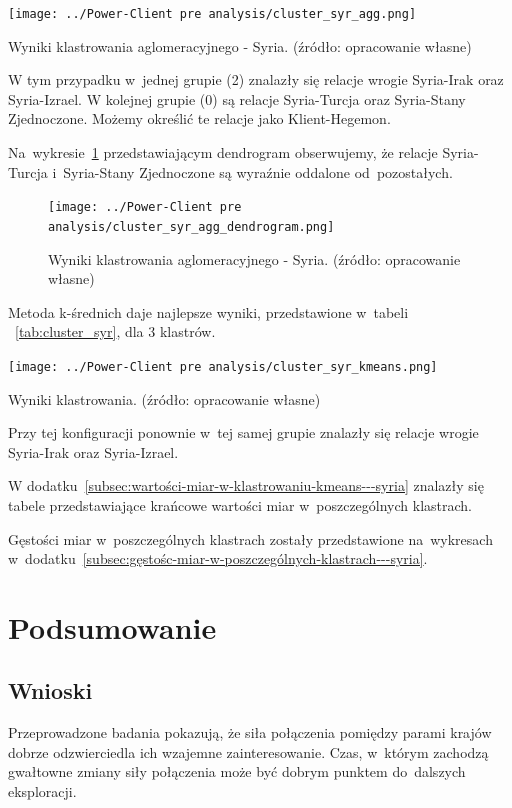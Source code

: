 \documentclass[11pt]{report}
\begin{document}
    \begin{table}[tp]
        \centering
        \texttt{[image: ../Power-Client pre analysis/cluster\_syr\_agg.png]}
        \caption{Wyniki klastrowania aglomeracyjnego - Syria. (źródło: opracowanie własne)}
        \label{tab:cluster_syr_agg}
    \end{table}

    W tym przypadku w~jednej grupie (2) znalazły się relacje wrogie Syria-Irak oraz Syria-Izrael.
    W kolejnej grupie (0) są relacje Syria-Turcja oraz Syria-Stany Zjednoczone.
    Możemy określić te relacje jako Klient-Hegemon.


    Na~wykresie~\ref{fig:cluster_syr_agg_dendrogram} przedstawiającym dendrogram obserwujemy, że relacje
    Syria-Turcja i~Syria-Stany Zjednoczone są wyraźnie oddalone od~pozostałych.

    \begin{figure}[tp]
        \centering
        \texttt{[image: ../Power-Client pre analysis/cluster\_syr\_agg\_dendrogram.png]}
        \caption{Wyniki klastrowania aglomeracyjnego - Syria. (źródło: opracowanie własne)}
        \label{fig:cluster_syr_agg_dendrogram}
    \end{figure}

    Metoda k-średnich daje najlepsze wyniki, przedstawione w~tabeli ~\ref{tab:cluster_syr}, dla 3 klastrów.

    \begin{table}[tp]
        \centering
        \texttt{[image: ../Power-Client pre analysis/cluster\_syr\_kmeans.png]}
        \caption{Wyniki klastrowania. (źródło: opracowanie własne)}
        \label{tab:cluster_syr}
    \end{table}

    Przy tej konfiguracji ponownie w~tej samej grupie znalazły się relacje wrogie Syria-Irak oraz Syria-Izrael.

    W dodatku~\ref{subsec:wartości-miar-w-klastrowaniu-kmeans---syria} znalazły się tabele przedstawiające krańcowe wartości miar w~poszczególnych klastrach.

    Gęstości miar w~poszczególnych klastrach zostały przedstawione na~wykresach w~dodatku~\ref{subsec:gęstośc-miar-w-poszczególnych-klastrach---syria}.


    \chapter{Podsumowanie}\label{ch:podsumowanie}


    \section{Wnioski}\label{sec:wnioski}
    Przeprowadzone badania pokazują, że siła połączenia pomiędzy parami krajów dobrze odzwierciedla ich wzajemne zainteresowanie.
    Czas, w~którym zachodzą gwałtowne zmiany siły połączenia może być dobrym punktem do~dalszych eksploracji.
\end{document}
